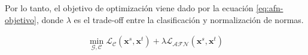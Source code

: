 Por lo tanto, el objetivo de optimización viene dado por la ecuación \ref{eq:afn-objetivo}, donde $\lambda$ es el
trade-off entre la clasificación y normalización de normas.

\begin{align}
    \min_{\mathcal{G}, \mathcal{C}} \mathcal{L}_{\mathcal{C}}(\mathbf{x}^s, \mathbf{x}^t) + \lambda \mathcal{L}_{\mathcal{AFN}}(\mathbf{x}^s, \mathbf{x}^t)
    \label{eq:afn-objetivo}
\end{align}